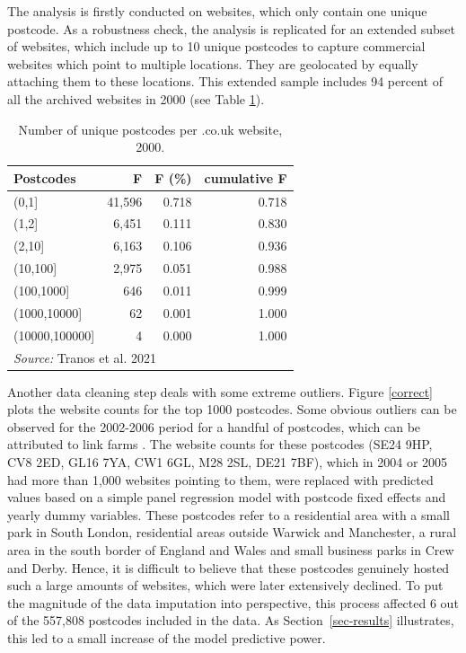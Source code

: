 \documentclass[
  authoryear,
  preprint,
  3p]{elsarticle}
\begin{document}
The analysis is firstly conducted on websites, which only contain one
unique postcode. As a robustness check, the analysis is replicated for
an extended subset of websites, which include up to 10 unique postcodes
to capture commercial websites which point to multiple locations. They
are geolocated by equally attaching them to these locations. This
extended sample includes 94 percent of all the archived websites in 2000
(see Table \ref{f2000}).

\begin{table}

\caption{Number of unique postcodes per .co.uk website, 2000.\label{f2000}}
\centering
\begin{tabular}[t]{lrrr}
\toprule
Postcodes & F & F (\%) & cumulative F\\
\midrule
(0,1] & 41,596 & 0.718 & 0.718\\
(1,2] & 6,451 & 0.111 & 0.830\\
(2,10] & 6,163 & 0.106 & 0.936\\
(10,100] & 2,975 & 0.051 & 0.988\\
(100,1000] & 646 & 0.011 & 0.999\\
\addlinespace
(1000,10000] & 62 & 0.001 & 1.000\\
(10000,100000] & 4 & 0.000 & 1.000\\
\bottomrule
\multicolumn{4}{l}{\rule{0pt}{1em}\textit{Source: } Tranos et al. 2021}\\
\end{tabular}
\end{table}

Another data cleaning step deals with some extreme outliers. Figure
\ref{correct} plots the website counts for the top 1000 postcodes. Some
obvious outliers can be observed for the 2002-2006 period for a handful
of postcodes, which can be attributed to link farms \citep{BL2013links}.
The website counts for these postcodes (SE24 9HP, CV8 2ED, GL16 7YA, CW1
6GL, M28 2SL, DE21 7BF), which in 2004 or 2005 had more than 1,000
websites pointing to them, were replaced with predicted values based on
a simple panel regression model with postcode fixed effects and yearly
dummy variables. These postcodes refer to a residential area with a
small park in South London, residential areas outside Warwick and
Manchester, a rural area in the south border of England and Wales and
small business parks in Crew and Derby. Hence, it is difficult to
believe that these postcodes genuinely hosted such a large amounts of
websites, which were later extensively declined. To put the magnitude of
the data imputation into perspective, this process affected 6 out of the
557,808 postcodes included in the data. As Section~\ref{sec-results}
illustrates, this led to a small increase of the model predictive power.
\end{document}
